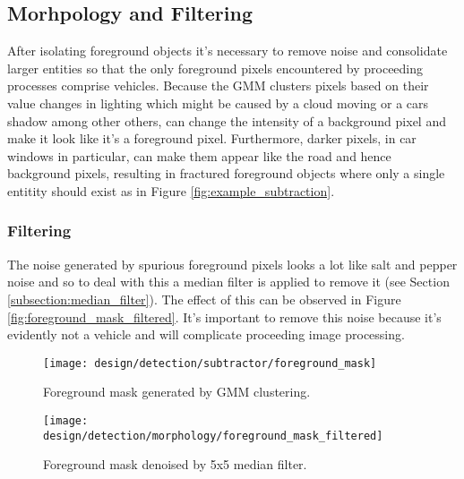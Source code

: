 \subsection{Morhpology and Filtering}

After isolating foreground objects it's necessary to remove noise and consolidate larger entities so that the only foreground pixels encountered by proceeding processes comprise vehicles. Because the GMM clusters pixels based on their value changes in lighting which might be caused by a cloud moving or a cars shadow among other others, can change the intensity of a background pixel and make it look like it's a foreground pixel. Furthermore, darker pixels, in car windows in particular, can make them appear like the road and hence background pixels, resulting in fractured foreground objects where only a single entitity should exist as in Figure \ref{fig:example_subtraction}.

\subsubsection{Filtering}

The noise generated by spurious foreground pixels looks a lot like salt and pepper noise and so to deal with this a median filter is applied to remove it (see Section \ref{subsection:median_filter}). The effect of this can be observed in Figure \ref{fig:foreground_mask_filtered}. It's important to remove this noise because it's evidently not a vehicle and will complicate proceeding image processing. 

\begin{figure*}[htbp]
    \centering 
    \begin{subfigure}[b]{0.45\textwidth}
        \texttt{[image: design/detection/subtractor/foreground\_mask]}
        \caption{Foreground mask generated by GMM clustering.}
    \end{subfigure}
    \begin{subfigure}[b]{0.45\textwidth}
        \texttt{[image: design/detection/morphology/foreground\_mask\_filtered]}
        \captionsetup{format = hang}
        \caption{Foreground mask denoised by 5x5 median filter.}
    \end{subfigure}
    \captionsetup{format=hang}
    \caption{A foreground mask generated from a traffic scene by OpenCV's GMM implementation.}
    \label{fig:foreground_mask_filtered}
\end{figure*}

